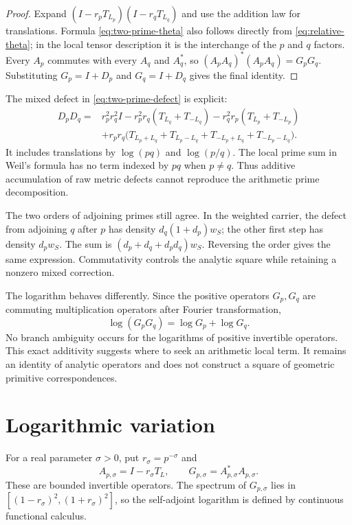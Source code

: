 \documentclass[11pt,letterpaper]{article}
\theoremstyle{definition}
\theoremstyle{remark}
\begin{document}
\begin{proof}
Expand $(I-r_pT_{L_p})(I-r_qT_{L_q})$ and use the addition law
for translations. Formula \eqref{eq:two-prime-theta} also follows
directly from \eqref{eq:relative-theta}; in the local tensor
description it is the interchange of the $p$ and $q$ factors.
Every $A_p$ commutes with every $A_q$ and $A_q^*$, so
$(A_pA_q)^*(A_pA_q)=G_pG_q$. Substituting $G_p=I+D_p$ and
$G_q=I+D_q$ gives the final identity.
\end{proof}

The mixed defect in \eqref{eq:two-prime-defect} is explicit:
\begin{align}
 D_pD_q={}&r_p^2r_q^2I
 -r_p^2r_q(T_{L_q}+T_{-L_q})
 -r_q^2r_p(T_{L_p}+T_{-L_p})\nonumber\\
 &+r_pr_q\bigl(T_{L_p+L_q}+T_{L_p-L_q}
            +T_{-L_p+L_q}+T_{-L_p-L_q}\bigr).
 \label{eq:mixed-translations}
\end{align}
It includes translations by $\log(pq)$ and $\log(p/q)$.
The local prime sum in Weil's formula has no term indexed by $pq$
when $p\ne q$. Thus additive accumulation of raw metric defects
cannot reproduce the arithmetic prime decomposition.

The two orders of adjoining primes still agree. In the weighted
carrier, the defect from adjoining $q$ after $p$ has density
$d_q(1+d_p)w_S$; the other first step has density $d_pw_S$.
The sum is $(d_p+d_q+d_pd_q)w_S$. Reversing the order gives the
same expression. Commutativity controls the analytic square while
retaining a nonzero mixed correction.

The logarithm behaves differently. Since the positive operators
$G_p,G_q$ are commuting multiplication operators after Fourier
transformation,
\begin{equation}\label{eq:log-additivity}
 \log(G_pG_q)=\log G_p+\log G_q.
\end{equation}
No branch ambiguity occurs for the logarithms of positive invertible
operators. This exact additivity suggests where to seek an arithmetic
local term. It remains an identity of analytic operators and does
not construct a square of geometric primitive correspondences.

\section{Logarithmic variation}

For a real parameter $\sigma>0$, put $r_\sigma=p^{-\sigma}$ and
\begin{equation}\label{eq:sigma-family}
 A_{p,\sigma}=I-r_\sigma T_L,\qquad
 G_{p,\sigma}=A_{p,\sigma}^*A_{p,\sigma}.
\end{equation}
These are bounded invertible operators. The spectrum of
$G_{p,\sigma}$ lies in $[(1-r_\sigma)^2,(1+r_\sigma)^2]$,
so the self-adjoint logarithm is defined by continuous functional
calculus.
\end{document}
